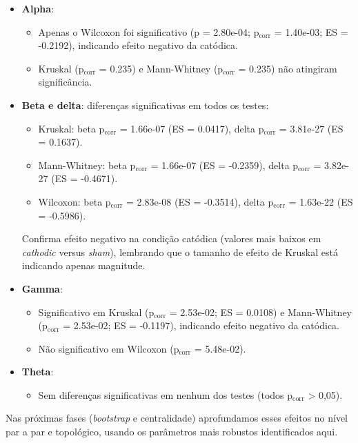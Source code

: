 \begin{itemize}
  \item \textbf{Alpha}:  
    \begin{itemize}
      \item Apenas o Wilcoxon foi significativo (p = 2.80e-04; p$_{\mathrm{corr}}$ = 1.40e-03; ES = -0.2192), indicando efeito negativo da catódica.
      \item Kruskal (p$_{\mathrm{corr}}$ = 0.235) e Mann-Whitney (p$_{\mathrm{corr}}$ = 0.235) não atingiram significância.
    \end{itemize}
  \item \textbf{Beta e delta}: diferenças significativas em todos os testes:
    \begin{itemize}
      \item Kruskal: beta p$_{\mathrm{corr}}$ = 1.66e-07 (ES = 0.0417), delta p$_{\mathrm{corr}}$ = 3.81e-27 (ES = 0.1637).  
      \item Mann-Whitney: beta p$_{\mathrm{corr}}$ = 1.66e-07 (ES = -0.2359), delta p$_{\mathrm{corr}}$ = 3.82e-27 (ES = -0.4671).  
      \item Wilcoxon: beta p$_{\mathrm{corr}}$ = 2.83e-08 (ES = -0.3514), delta p$_{\mathrm{corr}}$ = 1.63e-22 (ES = -0.5986).  
    \end{itemize}
    Confirma efeito negativo na condição catódica (valores mais baixos em \textit{cathodic} versus \textit{sham}), lembrando que o tamanho de efeito de Kruskal está indicando apenas magnitude.
  \item \textbf{Gamma}:  
    \begin{itemize}
      \item Significativo em Kruskal (p$_{\mathrm{corr}}$ = 2.53e-02; ES = 0.0108) e Mann-Whitney (p$_{\mathrm{corr}}$ = 2.53e-02; ES = -0.1197), indicando efeito negativo da catódica.
      \item Não significativo em Wilcoxon (p$_{\mathrm{corr}}$ = 5.48e-02).  
    \end{itemize}
  \item \textbf{Theta}:
    \begin{itemize}
      \item Sem diferenças significativas em nenhum dos testes (todos p$_{\mathrm{corr}}$ > 0,05).  
    \end{itemize}
\end{itemize}

Nas próximas fases (\textit{bootstrap} e centralidade) aprofundamos esses efeitos no nível par a par e topológico, usando os parâmetros mais robustos identificados aqui.  

